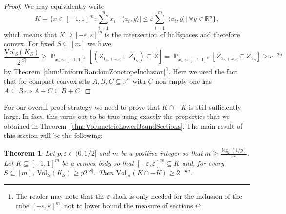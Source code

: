 \documentclass[12pt,english]{article}
\theoremstyle{theorem}
\newtheorem{theorem}{Theorem}
\theoremstyle{remark}
\def\rem#1{{\marginpar{\raggedright\scriptsize #1}}}
\providecommand{\setR}{\mathbb{R}}
\newcommand{\Vol}{\mathrm{Vol}}
\newcommand{\eps}{\varepsilon}
\renewcommand{\Pr}{\mathop{\mathbb{P}}}
\begin{document}
\begin{proof} 
  We may equivalently write
  \begin{equation} \label{eq:KinInequalityForm}
    K = \Big\{x \in [-1,1]^m : \sum_{i=1}^m x_i \cdot |\langle a_i, y \rangle| \le \eps \sum_{i =1}^m |\langle a_i, y \rangle| \ \forall y \in \setR^n\Big\},
 \end{equation}
 which means that $K \supseteq [-\eps,\eps]^m$ is the intersection of halfspaces and therefore convex. 
 For fixed $S \subseteq [m]$ we have
 \[
   \frac{\Vol_S(K_S)}{2^{|S|}} \geq \Pr_{x_S \sim [-1,1]^S}[(Z_{\bm{1}_S+x_S}+Z_{\bm{1}_{\bar{S}}}) \subseteq Z] =
   \Pr_{x_S \sim [-1,1]^S}[Z_{\bm{1}_S+x_S} \subseteq Z_{\bm{1}_S}] \geq e^{-2n}
 \]
 by Theorem~\ref{thm:UniformRandomZonotopeInclusion}\footnote{The reader may note that the $\varepsilon$-slack is only needed for the inclusion of the cube $[-\varepsilon,\varepsilon]^m$, not to lower bound the measure of sections.}. Here we used the fact that
 for compact convex sets $A,B,C \subseteq \setR^n$ with $C$ non-empty one has $A \subseteq B \Leftrightarrow A+C \subseteq B+C$.

\end{proof}
For our overall proof strategy we need to prove that $K \cap -K$ is still sufficiently large. In fact, this turns out to be true using exactly the
properties that we obtained in Theorem~\ref{thm:VolumetricLowerBoundSections}. %
The main result of this section will be the following:
\begin{theorem} \label{thm:LowerboundOnVolumeForKSymmetrizer}
Let $p, \eps \in (0, 1/2]$ and $m$ be a positive integer so that $m \ge \frac{\log_2 (1/p)}{\eps^2}$. Let $K \subseteq [-1,1]^m$ be a convex body so that $[-\eps,\eps]^m \subseteq K$ and, for every $S \subseteq [m]$, $\Vol_S (K_S) \ge p2^{|S|}$. Then $\Vol_m (K \cap -K) \ge 2^{-5m}$.
\end{theorem}
\end{document}
